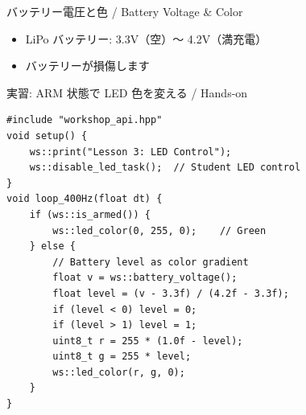 \documentclass[aspectratio=169, 14pt]{beamer}
\begin{document}
\begin{frame}{バッテリー電圧と色 / Battery Voltage \& Color}
  \begin{center}
  \end{center}

  \vspace{0.5em}

  \begin{itemize}
    \item LiPo バッテリー: 3.3V（空）〜 4.2V（満充電）
    \item {}バッテリーが損傷します
  \end{itemize}
\end{frame}

\begin{frame}[fragile]{実習: ARM 状態で LED 色を変える / Hands-on}
  \begin{lstlisting}[style=sfcpp, title={user\_code.cpp}]
#include "workshop_api.hpp"
void setup() {
    ws::print("Lesson 3: LED Control");
    ws::disable_led_task();  // Student LED control
}
void loop_400Hz(float dt) {
    if (ws::is_armed()) {
        ws::led_color(0, 255, 0);    // Green
    } else {
        // Battery level as color gradient
        float v = ws::battery_voltage();
        float level = (v - 3.3f) / (4.2f - 3.3f);
        if (level < 0) level = 0;
        if (level > 1) level = 1;
        uint8_t r = 255 * (1.0f - level);
        uint8_t g = 255 * level;
        ws::led_color(r, g, 0);
    }
}
  \end{lstlisting}
\end{frame}
\end{document}
